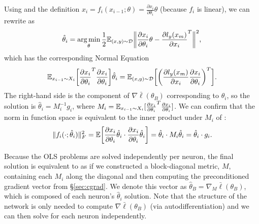 Using  and the definition
$x_i = f_i(x_{i-1};\theta)
= \frac{\partial x_i}{\partial \theta_i}\theta$
(because $f_i$ is linear),
we can rewrite  as
%
\begin{equation}
\label{eq:OLS2}
\hat{\theta}_i = \operatorname*{arg\,min}_{\theta} \frac{1}{2} \mathbb{E}_{(x,y) \sim {\mathcal{D}}}
\biggl \Vert \frac{\partial x_i}{\partial \theta_i}\theta - \frac{\partial l_{y}(x_m)}{\partial x_i}^T \biggr \Vert^2,
\end{equation}
%
which has the corresponding Normal Equation
%
\begin{align}
\mathbb{E}_{x_{i-1} \sim X_i} \biggl [ \frac{\partial x_i}{\partial \theta_i}^T\frac{\partial x_i}{\partial \theta_i} \biggr ] \hat{\theta}_i 
= \mathbb{E}_{(x,y) \sim {\mathcal{D}}} \biggl [ \biggl (\frac{\partial l_{y}(x_m)}{\partial x_i} \frac{\partial x_i}{\partial \theta_i} \biggr )^T \biggr ].
\label{eq:normal}
\end{align}
%
The right-hand side is the component of $\nabla \bar\ell(\theta_B)$ corresponding to $\theta_i$, so the solution is
$\hat{\theta}_i = M_i^{-1}g_i$, where
 $M_i = \mathbb{E}_{x_{i-1} \sim X_i} [ \frac{\partial x_i}{\partial \theta_i}^T  \frac{\partial x_i}{\partial \theta_i}]$.
We can confirm that the norm in function space is equivalent to the
inner product under $M_i$ of :
%
$$
\Vert f_i(\cdot; \hat{\theta}_i) \Vert^2_F
= \mathbb{E} \biggl [\frac{\partial x_i}{\partial \theta_i} \hat{\theta}_i \cdot \frac{\partial x_i}{\partial \theta_i} \hat{\theta}_i \biggr ]
= \hat{\theta}_i \cdot M_i \hat{\theta}_i
= \hat{\theta}_i \cdot g_i.
$$
%

Because the OLS problems are solved independently per neuron,
the final solution is equivalent to as if we constructed a block-diagonal metric, $M$,
containing each $M_i$ along the diagonal and then computing the preconditioned gradient
vector from \S \ref{sec:cgrad}. We denote this vector as $\hat{\theta}_B = \nabla_M \bar\ell(\theta_B)$,
which is composed of each neuron's $\hat{\theta}_i$ solution.
Note that the structure of the network is only needed to compute $\nabla \bar\ell(\theta_B)$ (via
autodifferentiation) and we can then solve  for each neuron independently.

